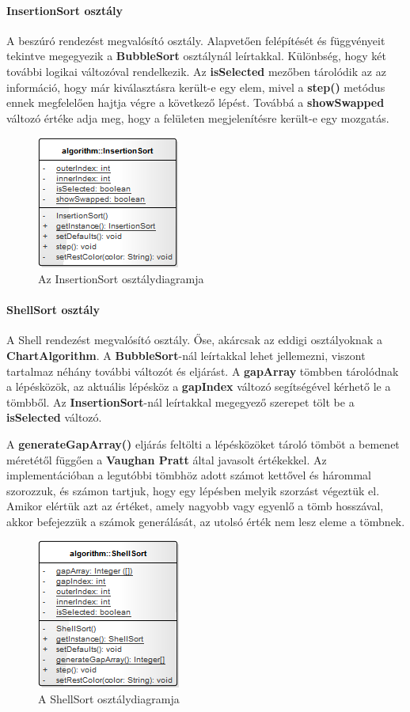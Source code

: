 \documentclass{elteikthesis}
\begin{document}
\paragraph{InsertionSort osztály}
A beszúró rendezést megvalósító osztály. Alapvetően felépítését és függvényeit tekintve megegyezik a \textbf{BubbleSort} osztálynál leírtakkal. Különbség, hogy két további logikai változóval rendelkezik. Az \textbf{isSelected} mezőben tárolódik az az információ, hogy már kiválasztásra került-e egy elem, mivel a \textbf{step()} metódus ennek megfelelően hajtja végre a következő lépést. Továbbá a \textbf{showSwapped} változó értéke adja meg, hogy a felületen megjelenítésre került-e egy mozgatás.
\begin{figure}[H]
	\centering
	\includegraphics{pics/class/InsertionSort.png}
	\caption{Az InsertionSort osztálydiagramja}
\end{figure}
\paragraph{ShellSort osztály}
A Shell rendezést megvalósító osztály. Őse, akárcsak az eddigi osztályoknak a \textbf{ChartAlgorithm}. A \textbf{BubbleSort}-nál leírtakkal lehet jellemezni, viszont tartalmaz néhány további változót és eljárást. A \textbf{gapArray} tömbben tárolódnak a lépésközök, az aktuális lépésköz a \textbf{gapIndex} változó segítségével kérhető le a tömbből. Az \textbf{InsertionSort}-nál leírtakkal megegyező szerepet tölt be a \textbf{isSelected} változó.\par
A \textbf{generateGapArray()} eljárás feltölti a lépésközöket tároló tömböt a bemenet méretétől függően a \textbf{Vaughan Pratt} által javasolt értékekkel\cite{Pratt}. Az implementációban a legutóbbi tömbhöz adott számot kettővel és hárommal szorozzuk, és számon tartjuk, hogy egy lépésben melyik szorzást végeztük el. Amikor elértük azt az értéket, amely nagyobb vagy egyenlő a tömb hosszával, akkor befejezzük a számok generálását, az utolsó érték nem lesz eleme a tömbnek.
\begin{figure}[H]
	\centering
	\includegraphics{pics/class/ShellSort.png}
	\caption{A ShellSort osztálydiagramja}
\end{figure}
\end{document}
